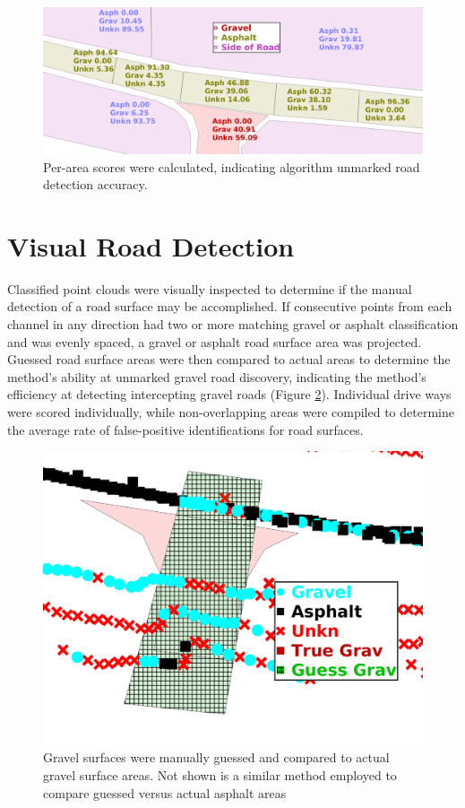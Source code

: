 \documentclass[numbered,pdftex]{ohio-etd}
\begin{document}
{{		\begin{figure}[H]
			\centering
			\includegraphics[width=0.90\linewidth]{Defense_Images/rm_db_1_area_score}
			\caption[Area Scores]{Per-area scores were calculated, indicating algorithm unmarked road detection accuracy. }
			\label{fig:rm_db_1_area_score}
		\end{figure}

		
	}

	\section{Visual Road Detection}\label{sec:manual_road_detection}{
	
		{Classified point clouds were visually inspected to determine if the manual detection of a road surface may be accomplished. If consecutive points from each channel in any direction had two or more matching gravel or asphalt classification and was evenly spaced, a gravel or asphalt road surface area was projected. Guessed road surface areas were then compared to actual areas to determine the method's ability at unmarked gravel road discovery, indicating the method's efficiency at detecting intercepting gravel roads (Figure \ref{fig:rm_db_6_overlap_2}). Individual drive ways were scored individually, while non-overlapping areas were compiled to determine the average rate of false-positive identifications for road surfaces.}	
		
		\begin{figure}[H]
			\centering
			\includegraphics[width=0.9\linewidth]{Defense_Images/rm_db_6_overlap_2}
			\caption[Projected Visual Guess vs Truth]{Gravel surfaces were manually guessed and compared to actual gravel surface areas. Not shown is a similar method employed to compare guessed versus actual asphalt areas}
			\label{fig:rm_db_6_overlap_2}
		\end{figure}	

}}
\end{document}
